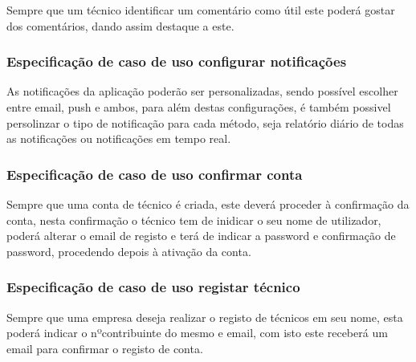 Sempre que um técnico identificar um comentário como útil este poderá gostar dos comentários, dando 
assim destaque a este.





% 




% 

\subsubsection{Especificação de caso de uso configurar notificações}

As notificações da aplicação poderão ser personalizadas, sendo possível escolher entre email, push e ambos,
para além destas configurações, é também possivel persolinzar o tipo de notificação para cada método, seja 
relatório diário de todas as notificações ou notificações em tempo real.



\newpage

\subsubsection{Especificação de caso de uso confirmar conta}

Sempre que uma conta de técnico é criada, este deverá proceder à confirmação da conta, nesta confirmação
o técnico tem de inidicar o seu nome de utilizador, poderá alterar o email de registo e terá de indicar a
password e confirmação de password, procedendo depois à ativação da conta.



\subsubsection{Especificação de caso de uso registar técnico}

Sempre que uma empresa deseja realizar o registo de técnicos em seu nome, esta poderá indicar o nºcontribuinte
do mesmo e email, com isto este receberá um email para confirmar o registo de conta.

